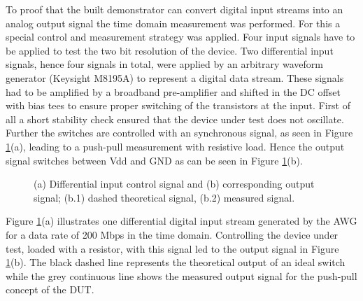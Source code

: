 \documentclass[journal]{IEEEtran}
\begin{document}
To proof that the built demonstrator can convert digital input streams into an analog output signal the time domain measurement was performed.
For this a special control and measurement strategy was applied.
Four input signals have to be applied to test the two bit resolution of the device. Two differential input signals, hence four signals in total, were applied by an arbitrary waveform generator (Keysight M8195A) to represent a digital data stream. 
These signals had to be amplified by a broadband pre-amplifier and shifted in the DC offset with bias tees to ensure proper switching of the transistors at the input.
%
First of all a short stability check ensured that the device under test does not oscillate.
Further the switches are controlled with an synchronous signal, as seen in Figure \ref{fig:meas_Input_Output_RLoad_100M_SmallSize_Paper}(a), leading to a push-pull measurement with resistive load.
Hence the output signal switches between Vdd and GND as can be seen in Figure \ref{fig:meas_Input_Output_RLoad_100M_SmallSize_Paper}(b).
%
\begin{figure}[htb]
  \centering
	\begin{scriptsize}
  	\def\svgwidth{\columnwidth}
 	 
  	\caption{(a) Differential input control signal and (b) corresponding output signal; (b.1) dashed theoretical signal, (b.2) measured signal.}
  	\label{fig:meas_Input_Output_RLoad_100M_SmallSize_Paper}
	\end{scriptsize}
\end{figure}
%
Figure \ref{fig:meas_Input_Output_RLoad_100M_SmallSize_Paper}(a) illustrates one differential digital input stream generated by the AWG for a data rate of 200 Mbps in the time domain.
Controlling the device under test, loaded with a resistor, with this signal led to the output signal in Figure \ref{fig:meas_Input_Output_RLoad_100M_SmallSize_Paper}(b).
The black dashed line represents the theoretical output of an ideal switch while the grey continuous line shows the measured output signal for the push-pull concept of the DUT.
\end{document}
